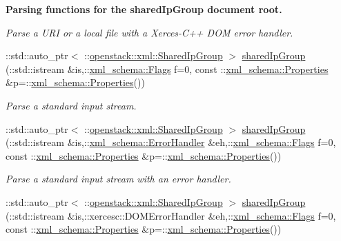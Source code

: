 \begin{Indent}{\bf Parsing functions for the sharedIpGroup document root.}
\begin{DoxyCompactItemize}
\begin{DoxyCompactList}\small\item\em Parse a URI or a local file with a Xerces-\/C++ DOM error handler. \item\end{DoxyCompactList}\item 
::std::auto\_\-ptr$<$ ::\hyperlink{classopenstack_1_1xml_1_1SharedIpGroup}{openstack::xml::SharedIpGroup} $>$ \hyperlink{namespaceopenstack_1_1xml_a2afdb7946d1424e8d837ba773abc722a}{sharedIpGroup} (::std::istream \&is,::\hyperlink{namespacexml__schema_affb4c227cbd9aa7453dd1dc5a1401943}{xml\_\-schema::Flags} f=0, const ::\hyperlink{namespacexml__schema_ad27ce19a7ee1d3b1064092648898f64c}{xml\_\-schema::Properties} \&p=::\hyperlink{namespacexml__schema_ad27ce19a7ee1d3b1064092648898f64c}{xml\_\-schema::Properties}())
\begin{DoxyCompactList}\small\item\em Parse a standard input stream. \item\end{DoxyCompactList}\item 
::std::auto\_\-ptr$<$ ::\hyperlink{classopenstack_1_1xml_1_1SharedIpGroup}{openstack::xml::SharedIpGroup} $>$ \hyperlink{namespaceopenstack_1_1xml_a8f017bf260a5bd00e8e32549efa47f94}{sharedIpGroup} (::std::istream \&is,::\hyperlink{namespacexml__schema_ab1c9361bfd3b404eaabf0c31eded79dc}{xml\_\-schema::ErrorHandler} \&eh,::\hyperlink{namespacexml__schema_affb4c227cbd9aa7453dd1dc5a1401943}{xml\_\-schema::Flags} f=0, const ::\hyperlink{namespacexml__schema_ad27ce19a7ee1d3b1064092648898f64c}{xml\_\-schema::Properties} \&p=::\hyperlink{namespacexml__schema_ad27ce19a7ee1d3b1064092648898f64c}{xml\_\-schema::Properties}())
\begin{DoxyCompactList}\small\item\em Parse a standard input stream with an error handler. \item\end{DoxyCompactList}\item 
::std::auto\_\-ptr$<$ ::\hyperlink{classopenstack_1_1xml_1_1SharedIpGroup}{openstack::xml::SharedIpGroup} $>$ \hyperlink{namespaceopenstack_1_1xml_aecd8729456651de47f1cb0f5dcd470b3}{sharedIpGroup} (::std::istream \&is,::xercesc::DOMErrorHandler \&eh,::\hyperlink{namespacexml__schema_affb4c227cbd9aa7453dd1dc5a1401943}{xml\_\-schema::Flags} f=0, const ::\hyperlink{namespacexml__schema_ad27ce19a7ee1d3b1064092648898f64c}{xml\_\-schema::Properties} \&p=::\hyperlink{namespacexml__schema_ad27ce19a7ee1d3b1064092648898f64c}{xml\_\-schema::Properties}())

\end{DoxyCompactItemize}
\end{Indent}
